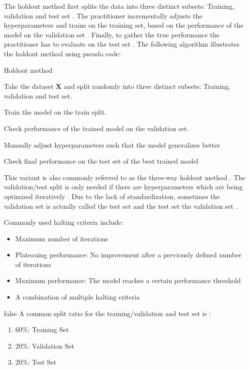 \documentclass[draft,final,oneside]{vutinfth} %
\begin{document}
The holdout method first splits the data into three distinct subsets: Training, validation and test set \cite{holdoutcrossvalidation}. The practitioner incrementally adjusts the hyperparameters and trains on the training set, based on the performance of the model on the validation set \cite{holdoutcrossvalidation}. Finally, to gather the true performance the practitioner has to evaluate on the test set \cite{holdoutcrossvalidation}. The following algorithm illustrates the holdout method using pseudo code:

\begin{algorithm}
\caption{Holdout method \cite{holdoutcrossvalidation}}\label{holdoutalgo}
Take the dataset $\boldsymbol{X}$ and split randomly into three distinct subsets: Training, validation and test set.

 {
Train the model on the train split.

Check performance of the trained model on the validation set.

Manually adjust hyperparameters such that the model generalizes better
}

Check final performance on the test set of the best trained model

\end{algorithm}

This variant is also commonly referred to as the three-way holdout method \cite{holdoutcrossvalidation}. The validation/test split is only needed if there are hyperparameters which are being optimized iteratively \cite{holdoutcrossvalidation}.
Due to the lack of standardization, sometimes the validation set is actually called the test set and the test set the validation set \cite{patternrecognitionandnn} \cite{anintroductiontoneuralnetworks}.

Commonly used halting criteria include:
\begin{itemize}
\item Maximum number of iterations \cite{kerashalting}
\item Plateauing performance: No improvement after a previously defined number of iterations \cite{haltingcriteria}
\item Maximum performance: The model reaches a certain performance threshold \cite{kerashalting}
\item A combination of multiple halting criteria \cite{kerashalting}
\end{itemize}

\if false
A common split ratio for the training/validation and test set is \cite{holdoutcrossvalidation}:
\begin{enumerate}
\item 60\%: Training Set
\item 20\%: Validation Set
\item 20\%: Test Set
\end{enumerate}
\fi
\end{document}
